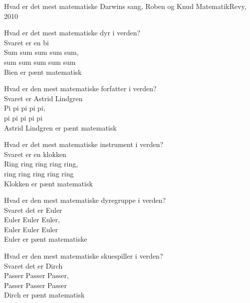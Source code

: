 \begin{song}{Hvad er det mest matematiske}
  {} %
  {Darwins sang, Roben og Knud} %
  {} %
  {MatematikRevy, 2010} %
  {\NotCCLIed} %

  \begin{SBVerse}
    Hvad er det mest matematiske dyr i verden?\\
    Svaret er en bi\\
    Sum sum sum sum sum,\\
    sum sum sum sum sum\\
    Bien er pænt matematisk
  \end{SBVerse}

  \begin{SBVerse}
    Hvad er den mest matematiske forfatter i verden?\\
    Svaret er Astrid Lindgren\\
    Pi pi pi pi pi,\\
    pi pi pi pi pi\\
    Astrid Lindgren er pænt matematisk
  \end{SBVerse}

  \begin{SBVerse}
    Hvad er det mest matematiske instrument i verden?\\
    Svaret er en klokken\\
    Ring ring ring ring ring,\\
    ring ring ring ring ring\\
    Klokken er pænt matematisk
  \end{SBVerse}

  \begin{SBVerse}
    Hvad er den mest matematiske dyregruppe i verden?\\
    Svaret det er Euler\\
    Euler Euler Euler,\\
    Euler Euler Euler\\
    Euler er pænt matematiske
  \end{SBVerse}

  \begin{SBVerse}
    Hvad er den mest matematiske skuespiller i verden?\\
    Svaret det er Dirch\\
    Passer Passer Passer,\\
    Passer Passer Passer\\
    Dirch er pænt matematisk
  \end{SBVerse}


\end{song}
